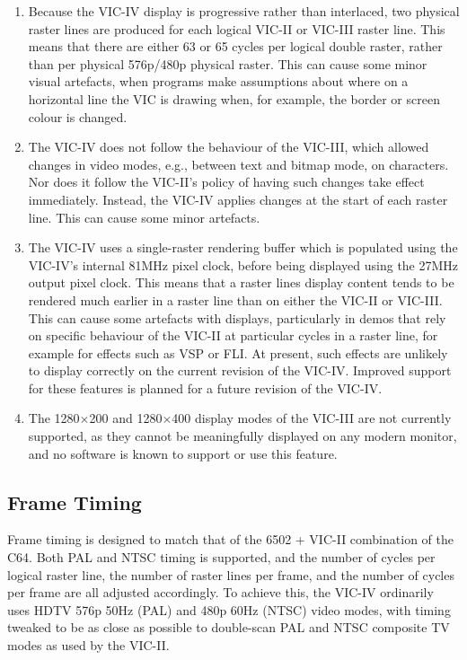 \begin{enumerate}
\item Because the VIC-IV display is progressive rather than interlaced, two physical raster lines are produced for each logical VIC-II or VIC-III raster line.  This means that there are either 63 or 65 cycles per logical double raster, rather than per physical 576p/480p physical raster. This can cause some minor visual artefacts, when programs make assumptions about where on a horizontal line the VIC is drawing when, for example, the border or screen colour is changed.
\item The VIC-IV does not follow the behaviour of the VIC-III, which allowed changes in video modes, e.g., between text and bitmap mode, on characters.  Nor does it follow the VIC-II's policy of having such changes take effect immediately.  Instead, the VIC-IV applies changes at the start of each raster line.  This can cause some minor artefacts.
\item The VIC-IV uses a single-raster rendering buffer which is populated using the VIC-IV's internal 81MHz pixel clock, before being displayed using the 27MHz output pixel clock.  This means that a raster lines display content tends to be rendered much earlier in a raster line than on either the VIC-II or VIC-III.  This can cause some artefacts with displays, particularly in demos that rely on specific behaviour of the VIC-II at particular cycles in a raster line, for example for effects such as VSP or FLI.  At present, such effects are unlikely to display correctly on the current revision of the VIC-IV.  Improved support for these features is planned for a future revision of the VIC-IV.
  \item The 1280$\times$200 and 1280$\times$400 display modes of the VIC-III are not currently supported, as they cannot be meaningfully displayed on any modern monitor, and no software is known to support or use this feature.
\end{enumerate}

\subsection{Frame Timing}

Frame timing is designed to match that of the 6502 + VIC-II combination of the C64.  Both PAL and NTSC timing is supported, and the number of cycles per logical raster line, the number of raster lines per frame, and the number of cycles per frame are all adjusted accordingly.  To achieve this, the VIC-IV ordinarily uses HDTV 576p 50Hz (PAL) and 480p 60Hz (NTSC) video modes, with timing tweaked to be as close as possible to double-scan PAL and NTSC composite TV modes as used by the VIC-II.

